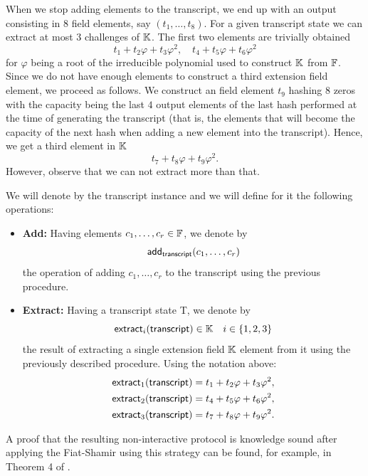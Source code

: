 When we stop adding elements to the transcript, we end up with an output consisting in $8$ field elements, say $(t_1, \dots, t_8)$. For a given transcript state we can extract at most $3$ challenges of $\mathbb{K}$. The first two elements are trivially obtained
\[
t_1 + t_2 \varphi + t_3 \varphi^2, \quad t_4 + t_5 \varphi + t_6 \varphi^2
\]
for $\varphi$ being a root of the irreducible polynomial used to construct $\mathbb{K}$ from $\mathbb{F}$. Since we do not have enough elements to construct a third extension field element, we proceed as follows. We construct an field element $t_9$ hashing $8$ zeros with the capacity being the last $4$ output elements of the last hash performed at the time of generating the transcript (that is, the elements that will become the capacity of the next hash when adding a new element into the transcript). Hence, we get a third element in $\mathbb{K}$
\[
t_7 + t_8 \varphi + t_9 \varphi^2.
\]
However, observe that we can not extract more than that. 

We will denote by \transcript the transcript instance and we will define for it the following operations:

\begin{itemize}

\item \textbf{Add:} Having elements $c_1, \dots, c_r \in \mathbb{F}$, we denote by 
\[
\textsf{add}_{\textsf{transcript}}(c_1, \dots, c_r)
\]
the operation of adding $c_1, \dots, c_r$ to the transcript using the previous procedure. 

\item \textbf{Extract:} Having a transcript state \textsf{T}, we denote by
\[
\mathsf{extract}_{i}(\textsf{transcript}) \in \mathbb{K} \quad i \in \{1, 2, 3\}
\]
the result of extracting a single extension field $\mathbb{K}$ element from it using the previously described procedure. Using the notation above:
\begin{align*}
&\mathsf{extract}_{1}(\textsf{transcript}) = t_1 + t_2 \varphi + t_3 \varphi^2, \\
&\mathsf{extract}_{2}(\textsf{transcript}) = t_4 + t_5 \varphi + t_6 \varphi^2, \\
&\mathsf{extract}_{3}(\textsf{transcript}) = t_7 + t_8 \varphi + t_9 \varphi^2.
\end{align*}
\end{itemize}

A proof that the resulting non-interactive protocol is knowledge sound after applying the Fiat-Shamir using this strategy can be found, for example, in Theorem 4 of \cite{EPRINT:AttFehKlo21}.
